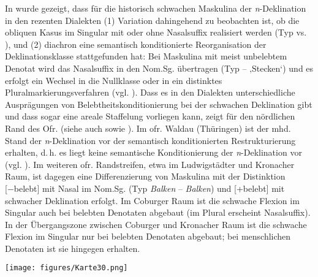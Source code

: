 In  wurde gezeigt, dass für die historisch schwachen Maskulina der \textit{n}{}-Deklination in den rezenten Dialekten (1) Variation dahingehend zu beobachten ist, ob die obliquen Kasus im Singular mit oder ohne Nasalsuffix realisiert werden (Typ   vs.  ), und (2) diachron eine semantisch konditionierte Reorganisation der Deklinationsklasse stattgefunden hat: Bei Maskulina mit meist unbelebtem Denotat wird das Nasalsuffix in den Nom.Sg. übertragen (Typ  --  ‚Stecken‘) und es erfolgt ein Wechsel in die Nullklasse oder in ein distinktes Pluralmarkierungsverfahren (vgl. ). Dass es in den Dialekten unterschiedliche Ausprägungen von Belebtheitskonditionierung bei der schwachen Deklination gibt und dass sogar eine areale Staffelung vorliegen kann, zeigt \citet[191]{Rowley1997} für den nördlichen Rand des Ofr. (siehe auch \citealt{HarnischRowley1990} sowie ). Im ofr. Waldau (Thüringen) ist der mhd. Stand der \textit{n}{}-Deklination vor der semantisch konditionierten Restrukturierung erhalten, d.\,h. es liegt keine semantische Konditionierung der \textit{n}{}-Deklination vor (vgl. ). Im weiteren ofr. Randstreifen, etwa im Ludwigstädter und Kronacher Raum, ist dagegen eine Differenzierung von Maskulina mit der Distinktion [−belebt] mit Nasal im Nom.Sg. (Typ \textit{Balken} -- \textit{Balken}) und [+belebt] mit schwacher Deklination erfolgt. Im Coburger Raum ist die schwache Flexion im Singular auch bei belebten Denotaten abgebaut (im Plural erscheint Nasalsuffix). In der Übergangszone zwischen Coburger und Kronacher Raum ist die schwache Flexion im Singular nur bei belebten Denotaten abgebaut; bei menschlichen Denotaten ist sie hingegen erhalten.

\vfill
\begin{map}[H]
\texttt{[image: figures/Karte30.png]}
\caption{Semantische Konditionierung der „schwachen“ Teilklassen N-N und N-0 durch die Distinktionen [+belebt] und [${\pm}$menschlich] bei den rezenten schwachen Maskulina ($n=124$)\protect\footnote{In den BSA-Daten ist nur ein schwaches Maskulinum mit dem Merkmal [+menschlich] in den obliquen Singularkasus erhoben worden (\textit{Bauer}); die Maskulina mit dem Merkmal [+belebt] und [$-$menschlich] sind \textit{Hase}, \textit{Hecht}, \textit{Karpfen}, \textit{Ochse}, \textit{Rabe} (\textit{Krack}), \textit{Ratte} und \textit{Spatz} (\textit{Sperk}).} }
\label{map:30}
\end{map}
\vfill\pagebreak

